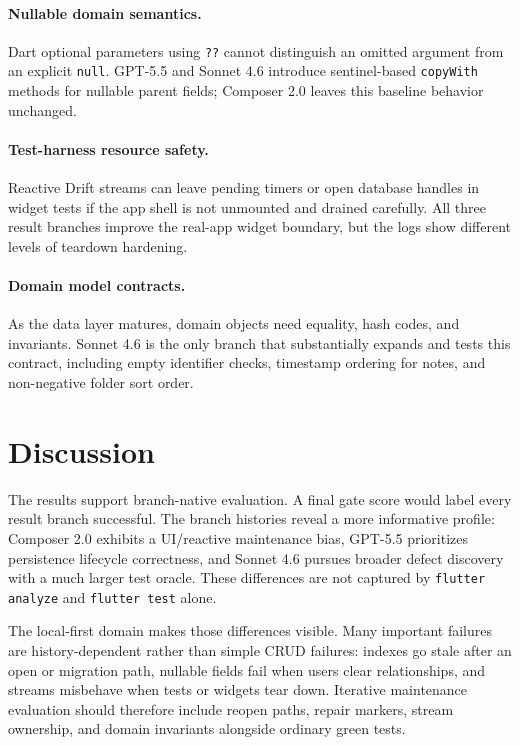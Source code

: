 \documentclass[11pt]{article}
\newcommand{\ComposerLabel}{Composer 2.0}
\newcommand{\GPTLabel}{GPT-5.5}
\newcommand{\SonnetLabel}{Sonnet 4.6}
\newcommand{\AnalyzeCmd}{\texttt{flutter analyze}}
\newcommand{\TestCmd}{\texttt{flutter test}}
\newcommand{\GateCmds}{\AnalyzeCmd{} and \TestCmd{}}
\begin{document}
\paragraph{Nullable domain semantics.}
Dart optional parameters using \texttt{??} cannot distinguish an omitted argument from an explicit \texttt{null}. \GPTLabel{} and \SonnetLabel{} introduce sentinel-based \texttt{copyWith} methods for nullable parent fields; \ComposerLabel{} leaves this baseline behavior unchanged.

\paragraph{Test-harness resource safety.}
Reactive Drift streams can leave pending timers or open database handles in widget tests if the app shell is not unmounted and drained carefully. All three result branches improve the real-app widget boundary, but the logs show different levels of teardown hardening.

\paragraph{Domain model contracts.}
As the data layer matures, domain objects need equality, hash codes, and invariants. \SonnetLabel{} is the only branch that substantially expands and tests this contract, including empty identifier checks, timestamp ordering for notes, and non-negative folder sort order.

\section{Discussion}
\label{sec:discussion}

The results support branch-native evaluation. A final gate score would label every result branch successful. The branch histories reveal a more informative profile: \ComposerLabel{} exhibits a UI/reactive maintenance bias, \GPTLabel{} prioritizes persistence lifecycle correctness, and \SonnetLabel{} pursues broader defect discovery with a much larger test oracle. These differences are not captured by \GateCmds{} alone.

The local-first domain makes those differences visible. Many important failures are history-dependent rather than simple CRUD failures: indexes go stale after an open or migration path, nullable fields fail when users clear relationships, and streams misbehave when tests or widgets tear down. Iterative maintenance evaluation should therefore include reopen paths, repair markers, stream ownership, and domain invariants alongside ordinary green tests.
\end{document}
